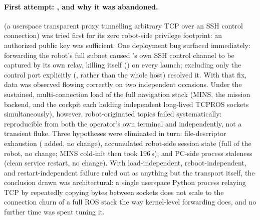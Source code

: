 \paragraph{First attempt: , and why it was abandoned.}
 (a userspace transparent proxy tunnelling arbitrary TCP over
an SSH control connection) was tried first for its zero robot-side
privilege footprint: an authorized public key was sufficient. One
deployment bug surfaced immediately: forwarding the robot's full subnet
caused 's own SSH control channel to be captured by its own
relay, killing itself () on every launch; excluding only
the control port explicitly (, rather than the
whole host) resolved it. With that fix, data was observed flowing correctly
on two independent occasions. Under the sustained, multi-connection load of
the full navigation stack (MINS, the mission backend, and the cockpit each
holding independent long-lived TCPROS sockets simultaneously), however,
robot-originated topics failed systematically: reproducible from both the
operator's own terminal and independently, not a transient fluke. Three
hypotheses were eliminated in turn: file-descriptor exhaustion
( added, no change), accumulated robot-side session
state (full  of the robot, no change; MINS cold-init then
took 196\,s), and PC-side process staleness (clean service restart, no
change). With load-independent, reboot-independent, and restart-independent
failure ruled out as anything but the transport itself, the conclusion drawn
was architectural: a single userspace Python process relaying TCP by
repeatedly copying bytes between sockets does not scale to the connection
churn of a full ROS stack the way kernel-level forwarding does, and no
further time was spent tuning it.

